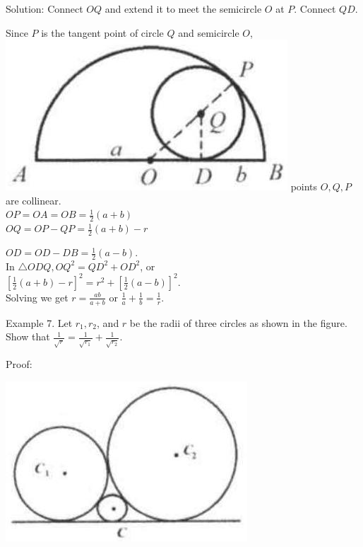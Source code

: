 \documentclass[10pt]{article}
\begin{document}
Solution:
Connect \(O Q\) and extend it to meet the semicircle \(O\) at \(P\). Connect \(Q D\).

Since \(P\) is the tangent point of circle \(Q\) and semicircle \(O\),\\
\includegraphics[max width=\textwidth]{2025_04_17_97bc1f7e44d93c271a88g-178(2)} points \(O, Q, P\) are collinear.\\
\(O P=O A=O B=\frac{1}{2}(a+b)\)\\
\(O Q=O P-Q P=\frac{1}{2}(a+b)-r\)


\(O D=O D-D B=\frac{1}{2}(a-b)\).\\
In \(\triangle O D Q, O Q^{2}=Q D^{2}+O D^{2}\), or\\
\(\left[\frac{1}{2}(a+b)-r\right]^{2}=r^{2}+\left[\frac{1}{2}(a-b)\right]^{2}\).\\
Solving we get \(r=\frac{a b}{a+b}\) or \(\frac{1}{a}+\frac{1}{b}=\frac{1}{r}\).

Example 7. Let \(r_{1}, r_{2}\), and \(r\) be the radii of three circles as shown in the figure.\\
Show that \(\frac{1}{\sqrt{r}}=\frac{1}{\sqrt{r_{1}}}+\frac{1}{\sqrt{r_{2}}}\).

Proof:
\begin{center}
\includegraphics[max width=\textwidth]{2025_04_17_97bc1f7e44d93c271a88g-179(2)}
\end{center}
\end{document}
